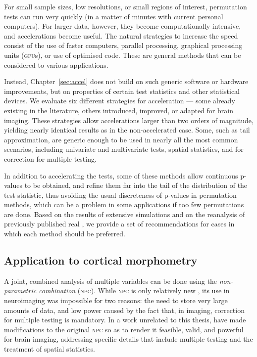 For small sample sizes, low resolutions, or small regions of interest, permutation tests can run very quickly (in a matter of minutes with current personal computers). For larger data, however, they become computationally intensive, and accelerations become useful. The natural strategies to increase the speed consist of the use of faster computers, parallel processing, graphical processing units (\textsc{gpu}s), or use of optimised code. These are general methods that can be considered to various applications.

Instead, Chapter~\ref{sec:accel} does not build on such generic software or hardware improvements, but on properties of certain test statistics and other statistical devices. We evaluate six different strategies for acceleration --- some already existing in the literature, others introduced, improved, or adapted for brain imaging. These strategies allow accelerations larger than two orders of magnitude, yielding nearly identical results as in the non-accelerated case. Some, such as tail approximation, are generic enough to be used in nearly all the most common scenarios, including univariate and multivariate tests, spatial statistics, and for correction for multiple testing.

In addition to accelerating the tests, some of these methods allow continuous p-values to be obtained, and refine them far into the tail of the distribution of the test statistic, thus avoiding the usual discreteness of p-values in permutation methods, which can be a problem in some applications if too few permutations are done. Based on the results of extensive simulations and on the reanalysis of previously published real \citep{Douaud2007}, we provide a set of recommendations for cases in which each method should be preferred.

\subsection{Application to cortical morphometry}

A joint, combined analysis of multiple variables can be done using the \emph{non-parametric combination} (\textsc{npc}). While \textsc{npc} is only relatively new \citep{Pesarin2010}, its use in neuroimaging was impossible for two reasons: the need to store very large amounts of data, and low power caused by the fact that, in imaging, correction for multiple testing is mandatory. In a work unrelated to this thesis, \citet{Winkler2016_npc} have made modifications to the original \textsc{npc} so as to render it feasible, valid, and powerful for brain imaging, addressing specific details that include multiple testing and the treatment of spatial statistics.

